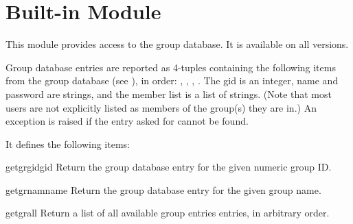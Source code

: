 \section{Built-in Module }

This module provides access to the \UNIX{} group database.
It is available on all \UNIX{} versions.

Group database entries are reported as 4-tuples containing the
following items from the group database (see ), in order:
,
,
,
.
The gid is an integer, name and password are strings, and the member
list is a list of strings.
(Note that most users are not explicitly listed as members of the
group(s) they are in.)
An exception is raised if the entry asked for cannot be found.

It defines the following items:

\renewcommand{\indexsubitem}{(in module grp)}
\begin{funcdesc}{getgrgid}{gid}
Return the group database entry for the given numeric group ID.
\end{funcdesc}

\begin{funcdesc}{getgrnam}{name}
Return the group database entry for the given group name.
\end{funcdesc}

\begin{funcdesc}{getgrall}{}
Return a list of all available group entries entries, in arbitrary order.
\end{funcdesc}
